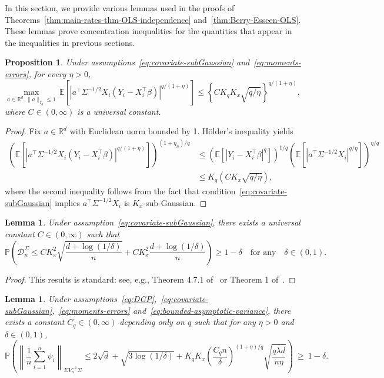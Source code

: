 \documentclass[11pt]{article}
\newtheorem{lemma}[theorem]{Lemma}
\newtheorem{proposition}[theorem]{Proposition}
\begin{document}
\begin{appendices}
In this section, we provide various lemmas used in the proofs of Theorems~\ref{thm:main-rates-thm-OLS-independence} and~\ref{thm:Berry-Esseen-OLS}. These lemmas prove concentration inequalities for the quantities that appear in the inequalities in previous sections. 
\begin{proposition}\label{prop:implication-moments-influence-function}
Under assumptions~\ref{eq:covariate-subGaussian} and~\ref{eq:moments-errors}, for every $\eta > 0$,
\[
\max_{a\in\mathbb{R}^d, \|a\|_{I_d} \le 1}\,\mathbb{E}\left[|a^{\top}\Sigma^{-1/2}X_i(Y_i - X_i^{\top}\beta)|^{q/(1+\eta)}\right] \le \left\{CK_qK_x\sqrt{q/\eta}\right\}^{q/(1+\eta)},
\] 
where $C\in(0, \infty)$ is a universal constant.
\end{proposition}
\begin{proof}
Fix $a\in\mathbb{R}^d$ with Euclidean norm bounded by 1. H{\"o}lder's inequality yields
\begin{align*}
\left(\mathbb{E}\left[|a^{\top}\Sigma^{-1/2}X_i(Y_i - X_i^{\top}\beta)|^{q/(1+\eta)}\right]\right)^{(1+\eta_n)/q} &\le (\mathbb{E}[|Y_i - X_i^{\top}\beta|^q])^{1/q}\left(\mathbb{E}[|a^{\top}\Sigma^{-1/2}X_i|^{q/\eta}]\right)^{\eta/q}\\
&\le K_q(CK_x\sqrt{q/\eta}),
\end{align*}
where the second inequality follows from the fact that condition~\ref{eq:covariate-subGaussian} implies $a^{\top} \Sigma^{-1/2}X_i$ is $K_x$-sub-Gaussian.
\end{proof}
\begin{lemma}\label{lem:concentration-of-covariance}
Under assumption~\ref{eq:covariate-subGaussian}, there exists a universal constant $C \in (0, \infty)$ such that
\[
\mathbb{P}\left(\mathcal{D}_n^{\Sigma} \le CK_x^2\sqrt{\frac{d + \log(1/\delta)}{n}} + CK_x^2\frac{d + \log(1/\delta)}{n}\right) \ge 1 - \delta\quad\mbox{for any}\quad\delta\in(0, 1).
\]
\end{lemma}
\begin{proof}
This results is standard: see, e.g., Theorem 4.7.1 of~\cite{Vershynin18} or Theorem 1 of~\cite{koltchinskii2017a}.
\end{proof}
\begin{lemma}\label{lem:concentration-influence-function}
Under assumptions~\ref{eq:DGP},~\ref{eq:covariate-subGaussian},~\ref{eq:moments-errors} and~\ref{eq:bounded-asymptotic-variance}, there exists a constant $C_q\in(0,\infty)$ depending only on $q$ such that for any $\eta > 0$ and $\delta\in(0, 1)$,
\[
\mathbb{P}\left(\left\|\frac{1}{n}\sum_{i=1}^n \psi_i\right\|_{\Sigma V^{-1}_n\Sigma} \le 2\sqrt{d} + \sqrt{3\log(1/\delta)} + K_qK_x\left(\frac{C_qn}{\delta}\right)^{{(1+\eta)}/{q}}\sqrt{\frac{q\overline{\lambda}d}{n\eta}}\right) ~\ge~ 1 - \delta.
\]
\end{lemma}
\end{appendices}
\end{document}
